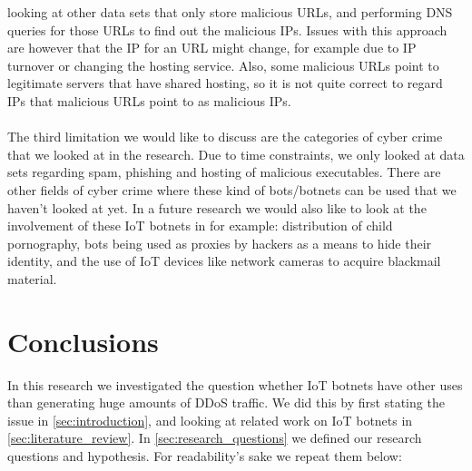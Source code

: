 \documentclass[a4paper,10pt]{article}
\begin{document}
looking at other data sets that only store malicious URLs, and performing DNS queries for those URLs to find out the malicious IPs.
Issues with this approach are however that the IP for an URL might change, for example due to IP turnover or changing the hosting
service. Also, some malicious URLs point to legitimate servers that have shared hosting, so it is not quite correct to regard IPs that
malicious URLs point to as malicious IPs.
\\\\
The third limitation we would like to discuss are the categories of cyber crime that we looked at in the research. Due to time 
constraints, we only looked at data sets regarding spam, phishing and hosting of malicious executables. There are other fields of 
cyber crime where these kind of bots/botnets can be used that we haven't looked at yet. In a future research we would also like to 
look at the involvement of these IoT botnets in for example: distribution of child pornography, bots being used as proxies by hackers
as a means to hide their identity, and the use of IoT devices like network cameras to acquire blackmail material.

\section{Conclusions} \label{sec:conclusions}
In this research we investigated the question whether IoT botnets have other uses than generating huge amounts of DDoS traffic.
We did this by first stating the issue in \autoref{sec:introduction}, and looking at related work on IoT botnets in \autoref{sec:literature_review}.
In \autoref{sec:research_questions} we defined our research questions and hypothesis. For readability's sake we repeat them below:
\end{document}

